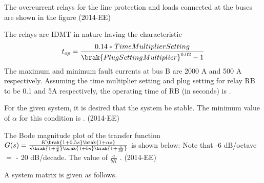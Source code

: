 

\iffalse
\author{Golla Shriram - AI24BTech11010}
\section{ee}
\chapter{2014 }
\fi


		 
	 \item The overcurrent relays for the line protection and loads connected at the buses are shown in the figure \hfill{(2014-EE)}
     \begin{center}

\end{center}


	 
The relays are IDMT in nature having the characteristic
$$  t_{op} = \frac{0.14 * Time Multiplier Setting}{\brak{Plug Setting Multiplier}^{0.02}-1}        $$
The maximum and minimum fault currents at bus B are 2000 A and 500 A respectively. Assuming
the time multiplier setting and plug setting for relay RB to be 0.1 and 5A respectively, the operating
time of RB  (in seconds) is \underline{\hspace{2.5 cm}}.

\item For the given system, it is desired that the system be stable. The minimum value of $\alpha$ for this
condition is \underline{\hspace{2.5 cm}}. \hfill{(2014-EE)}

\begin{center}

\end{center}




\item The Bode magnitude plot of the transfer function $G(s) =\frac{K\brak{1+0.5s}\brak{1+\alpha s} }{s\brak{1+\frac{s}{8}}\brak{1+bs}\brak{1+\frac{s}{36}} }$ is shown below:
Note that -6 dB/octave $=$ - 20 dB/decade. The value of $\frac{a}{bK}$ \underline{\hspace{2.5 cm}}.  \hfill{(2014-EE)} 


\begin{center}

\end{center}


\item A system matrix is given as follows.


